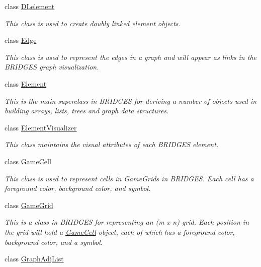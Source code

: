 \begin{DoxyCompactItemize}
class \mbox{\hyperlink{classbridges_1_1base_1_1_d_lelement}{D\+Lelement}}
\begin{DoxyCompactList}\small\item\em This class is used to create doubly linked element objects. \end{DoxyCompactList}\item 
class \mbox{\hyperlink{classbridges_1_1base_1_1_edge}{Edge}}
\begin{DoxyCompactList}\small\item\em This class is used to represent the edges in a graph and will appear as links in the B\+R\+I\+D\+G\+ES graph visualization. \end{DoxyCompactList}\item 
class \mbox{\hyperlink{classbridges_1_1base_1_1_element}{Element}}
\begin{DoxyCompactList}\small\item\em This is the main superclass in B\+R\+I\+D\+G\+ES for deriving a number of objects used in building arrays, lists, trees and graph data structures. \end{DoxyCompactList}\item 
class \mbox{\hyperlink{classbridges_1_1base_1_1_element_visualizer}{Element\+Visualizer}}
\begin{DoxyCompactList}\small\item\em This class maintains the visual attributes of each B\+R\+I\+D\+G\+ES element. \end{DoxyCompactList}\item 
class \mbox{\hyperlink{classbridges_1_1base_1_1_game_cell}{Game\+Cell}}
\begin{DoxyCompactList}\small\item\em This class is used to represent cells in Game\+Grids in B\+R\+I\+D\+G\+ES. Each cell has a foreground color, background color, and symbol. \end{DoxyCompactList}\item 
class \mbox{\hyperlink{classbridges_1_1base_1_1_game_grid}{Game\+Grid}}
\begin{DoxyCompactList}\small\item\em This is a class in B\+R\+I\+D\+G\+ES for representing an (m x n) grid. Each position in the grid will hold a \mbox{\hyperlink{classbridges_1_1base_1_1_game_cell}{Game\+Cell}} object, each of which has a foreground color, background color, and a symbol. \end{DoxyCompactList}\item 
class \mbox{\hyperlink{classbridges_1_1base_1_1_graph_adj_list}{Graph\+Adj\+List}}

\end{DoxyCompactItemize}
